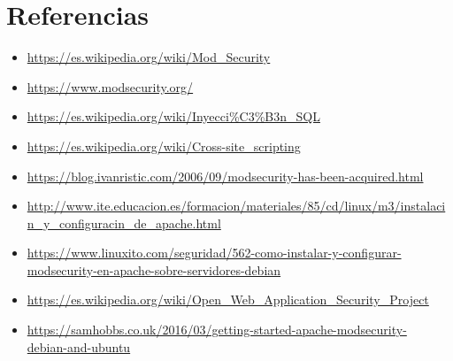 \documentclass[12pt,letterpaper]{article}
\begin{document}
\section{Referencias}
\begin{itemize}
	\item \url{https://es.wikipedia.org/wiki/Mod_Security}
	\item \url{https://www.modsecurity.org/}
	\item \url{https://es.wikipedia.org/wiki/Inyecci\%C3\%B3n_SQL}
	\item \url{https://es.wikipedia.org/wiki/Cross-site_scripting}
	\item \url{https://blog.ivanristic.com/2006/09/modsecurity-has-been-acquired.html}
	\item \url{http://www.ite.educacion.es/formacion/materiales/85/cd/linux/m3/instalacin_y_configuracin_de_apache.html}
	\item \url{https://www.linuxito.com/seguridad/562-como-instalar-y-configurar-}\\\url{modsecurity-en-apache-sobre-servidores-debian}
	\item \url{https://es.wikipedia.org/wiki/Open_Web_Application_Security_Project}
	\item \url{https://samhobbs.co.uk/2016/03/getting-started-apache-modsecurity-}\\\url{debian-and-ubuntu}
\end{itemize}
\end{document}
